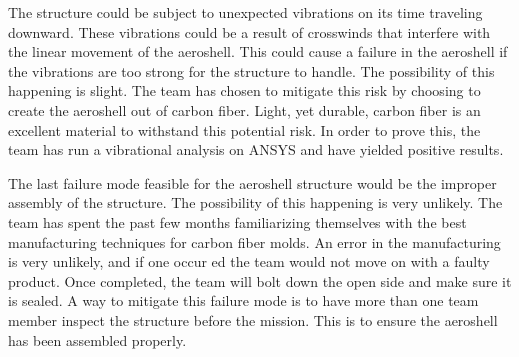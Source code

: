 The structure could be subject to unexpected vibrations on its time traveling downward. These vibrations could be a result of crosswinds that interfere with the linear movement of the aeroshell. This could cause a failure in the aeroshell if the vibrations are too strong for the structure to handle. The possibility of this happening is slight. The team has chosen to mitigate this risk by choosing to create the aeroshell out of carbon fiber. Light, yet durable, carbon fiber is an excellent material to withstand this potential risk. In order to prove this, the team has run a vibrational analysis on ANSYS and have yielded positive results.

The last failure mode feasible for the aeroshell structure would be the improper assembly of the structure. The possibility of this happening is very unlikely. The team has spent the past few months familiarizing themselves with the best manufacturing techniques for carbon fiber molds. An error in the manufacturing is very unlikely, and if one occur ed the team would not move on with a faulty product. Once completed, the team will bolt down the open side and make sure it is sealed. A way to mitigate this failure mode is to have more than one team member inspect the structure before the mission. This is to ensure the aeroshell has been assembled properly.

